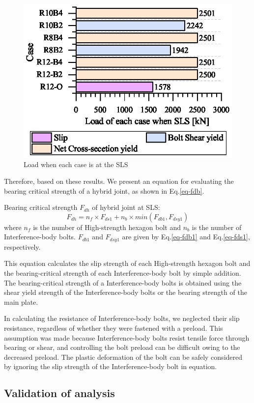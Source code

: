 \begin{figure}
    \centering
    \includegraphics[width=0.65\linewidth]{imgs/ch5/P-SLS.eps}
    \caption{Load when each case is at the SLS}
    \label{fig-PSLS}
\end{figure}


Therefore, based on these results. We present an equation for evaluating the bearing critical strength of a hybrid joint, as shown in Eq.\ref{eq-fdb}. 

\noindent Bearing critical strength $F_{dh}$ of hybrid joint at SLS:
\begin{equation}
    \label{eq-fdb}
    F_{dh}= n_f \times F_{ds1} + n_b\times min(F_{db1}, F_{dsy1})
\end{equation}
where $n_{f}$ is the number of High-strength hexagon bolt and $n_b$ is the number of Interference-body bolts. $F_{db1}$ and $F_{dsy1}$ are given by Eq.\ref{eq-fdb1} and Eq.\ref{eq-fds1}, respectively.

This equation calculates the slip strength of each High-strength hexagon bolt and the bearing-critical strength of each Interference-body bolt by simple addition. The bearing-critical strength of a Interference-body bolts is obtained using the shear yield strength of the Interference-body bolts or the bearing strength of the main plate.

In calculating the resistance of Interference-body bolts, we neglected their slip resistance, regardless of whether they were fastened with a preload. This assumption was made because Interference-body bolts resist tensile force through bearing or shear, and controlling the bolt preload can be difficult owing to the decreased preload. The plastic deformation of the bolt can be safely considered by ignoring the slip strength of the Interference-body bolt in equation.

\subsection{Validation of analysis}

